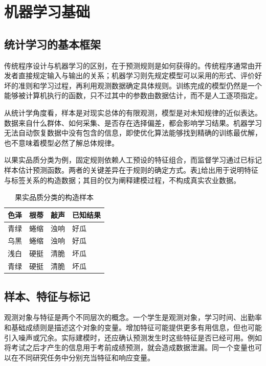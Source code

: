 \section{机器学习基础}\label{ch:foundations}

\subsection{统计学习的基本框架}

传统程序设计与机器学习的区别，在于预测规则是如何获得的。传统程序通常由开发者直接规定输入与输出的关系；机器学习则先规定模型可以采用的形式、评价好坏的准则和学习过程，再利用观测数据确定具体规则。训练完成的模型仍然是一个能够被计算机执行的函数，只不过其中的参数由数据估计，而不是人工逐项指定。

从统计学角度看，样本是对现实总体的有限观测，模型是对未知规律的近似表达。数据来自什么群体、如何采集、是否存在选择偏差，都会影响学习结果。机器学习无法自动恢复数据中没有包含的信息，即使优化算法能够找到精确的训练最优解，也不意味着模型必然了解总体规律。

以果实品质分类为例，固定规则依赖人工预设的特征组合，而监督学习通过已标记样本估计预测函数。两者的关键差异在于规则的确定方式。表\ref{tab:watermelon}给出用于说明特征与标签关系的构造数据；其目的仅为阐释建模过程，不构成真实农业数据。

\begin{table}[htbp]\centering
\caption{果实品质分类的构造样本}\label{tab:watermelon}
\begin{tabular}{llll}\toprule
色泽&根蒂&敲声&已知结果\\\midrule
青绿&蜷缩&浊响&好瓜\\
乌黑&蜷缩&浊响&好瓜\\
浅白&硬挺&清脆&坏瓜\\
青绿&硬挺&清脆&坏瓜\\\bottomrule
\end{tabular}\end{table}

\subsection{样本、特征与标记}

观测对象与特征是两个不同层次的概念。一个学生是观测对象，学习时间、出勤率和基础成绩则是描述这个对象的变量。增加特征可能提供更多有用信息，但也可能引入噪声或冗余。实际建模时，还应确认预测发生时这些特征是否已经可用。例如将考试之后才产生的信息用于考前成绩预测，就会造成数据泄漏。同一个变量也可以在不同研究任务中分别充当特征和响应变量。

